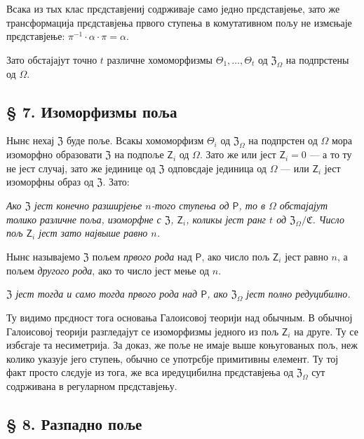 \documentclass[11pt]{article}
\begin{document}
Всака из тых клас прєдставјениј содрживаје само једно прєдставјење, зато же трансформација прєдставјења првого ступења в комутативном пољу не измєњаје прєдставјење: \(\pi^{-1}\cdot\alpha\cdot\pi=\alpha\).

Зато обстајајут точно \(t\) различне хомоморфизмы \(\Theta_1,\ldots,\Theta_t\) од \(\mathfrak Z_\Omega\) на подпрстены од \(\Omega\).

\subsection*{§ 7. Изоморфизмы поља}\label{die-isomorphismen-eines-koerpers}

Нынє нехај \(\mathfrak Z\) буде поље. Всакы хомоморфизм \(\Theta_i\) од \(\mathfrak Z_\Omega\) на подпрстен од \(\Omega\) мора изоморфно образовати \(\mathfrak Z\) на подпоље \(\mathsf{Z}_i\) од \(\Omega\). Зато же или јест \(\mathsf{Z}_i=0\) --- а то ту не јест случај, зато же јединице од \(\mathfrak Z\) одповєдаје јединица од \(\Omega\) --- или \(\mathsf{Z}_i\) јест изоморфны образ од \(\mathfrak Z\). Зато:

\emph{Ако \(\mathfrak Z\) јест конечно разширјење \(n\)-того ступења од \(\mathsf P\), то в \(\Omega\) обстајајут толико различне поља, изоморфне с \(\mathfrak Z\), \(\mathsf{Z}_i\), коликы јест ранг \(t\) од \(\mathfrak Z_\Omega/\mathfrak C\). Число пољ \(\mathsf{Z}_i\) јест зато највыше равно \(n\).}

Нынє называјемо \(\mathfrak Z\) пољем \emph{првого рода} над \(\mathsf P\), ако число пољ \(\mathsf{Z}_i\) јест равно \(n\), а пољем \emph{другого рода}, ако то число јест мење од \(n\).

\emph{\(\mathfrak Z\) јест тогда и само тогда првого рода над \(\mathsf P\), ако \(\mathfrak Z_\Omega\) јест полно редуцибилно.}

Ту видимо прєдност тога основања Галоисовој теорији над обычным. В обычној Галоисовој теорији разгледајут се изоморфизмы једного из пољ \(\mathsf{Z}_i\) на друге. Ту се избєгаје та несиметрија. За доказ, же поље не имаје выше коњугованых пољ, неж колико указује јего ступењ, обычно се употрєбје примитивны елемент. Ту тој факт просто слєдује из тога, же вса иредуцибилна прєдставјења од \(\mathfrak Z_\Omega\) сут содрживана в регуларном прєдставјењу.

\subsection*{§ 8. Разпадно поље}\label{der-zerfaellungskoerper}
\end{document}
